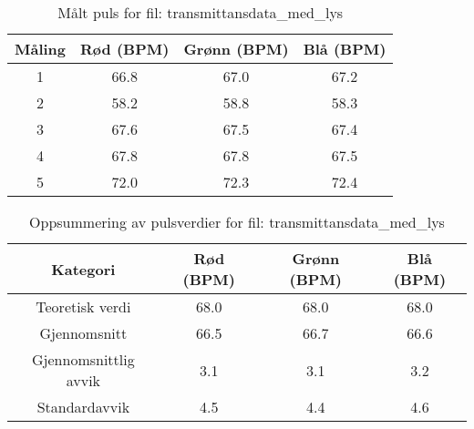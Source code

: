 
\begin{table}[H]
\centering
\caption{Målt puls for fil: transmittansdata\_med\_lys}
\label{tab:transmittansdata\_med\_lys}
\begin{tabular}{|c|c|c|c|}
\hline
\textbf{Måling} & \textbf{Rød (BPM)} & \textbf{Grønn (BPM)} & \textbf{Blå (BPM)} \\ \hline
1 & 66.8 & 67.0 & 67.2 \\ \hline
2 & 58.2 & 58.8 & 58.3 \\ \hline
3 & 67.6 & 67.5 & 67.4 \\ \hline
4 & 67.8 & 67.8 & 67.5 \\ \hline
5 & 72.0 & 72.3 & 72.4 \\ \hline
\end{tabular}
\end{table}

\begin{table}[H]
\centering
\caption{Oppsummering av pulsverdier for fil: transmittansdata\_med\_lys}
\label{tab:transmittansdata\_med\_lys_summary}
\begin{tabular}{|c|c|c|c|}
\hline
\textbf{Kategori} & \textbf{Rød (BPM)} & \textbf{Grønn (BPM)} & \textbf{Blå (BPM)} \\ \hline
Teoretisk verdi & 68.0 & 68.0 & 68.0 \\ \hline
Gjennomsnitt & 66.5 & 66.7 & 66.6 \\ \hline
Gjennomsnittlig avvik & 3.1 & 3.1 & 3.2 \\ \hline
Standardavvik & 4.5 & 4.4 & 4.6 \\ \hline
\end{tabular}
\end{table}